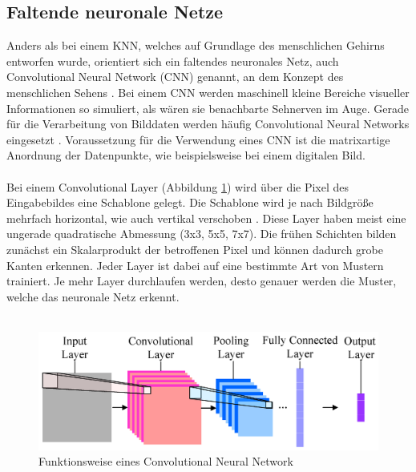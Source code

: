 \documentclass[a4paper,12pt,oneside]{article}
\begin{document}
\subsection{Faltende neuronale Netze}
Anders als bei einem KNN, welches auf Grundlage des menschlichen Gehirns entworfen wurde, orientiert sich ein faltendes neuronales Netz, auch \glqq Convolutional Neural Network\grqq{} (CNN) genannt, an dem Konzept des menschlichen Sehens \cite{lecun1989backpropagation}. Bei einem CNN werden maschinell kleine Bereiche visueller Informationen so simuliert, als wären sie benachbarte Sehnerven im Auge. Gerade für die Verarbeitung von Bilddaten werden häufig \glqq Convolutional Neural Networks\grqq{} eingesetzt \cite[326]{goodfellow2016deep}. Voraussetzung für die Verwendung eines CNN ist die matrixartige Anordnung der Datenpunkte, wie beispielsweise bei einem digitalen Bild.
\\
\\
Bei einem \glqq Convolutional Layer\grqq{} (Abbildung \ref{img:CNN}) wird über die Pixel des Eingabebildes eine Schablone gelegt. Die Schablone wird je nach Bildgröße mehrfach horizontal, wie auch vertikal verschoben \cite[327-335]{goodfellow2016deep}. Diese Layer haben meist eine ungerade quadratische Abmessung (3x3, 5x5, 7x7). Die frühen Schichten bilden zunächst ein Skalarprodukt der betroffenen Pixel und können dadurch grobe Kanten erkennen. Jeder Layer ist dabei auf eine bestimmte Art von Mustern trainiert. Je mehr Layer durchlaufen werden, desto genauer werden die Muster, welche das neuronale Netz erkennt.
\\
\\
\begin{figure}
    [h]
	\centering
		\includegraphics[scale=1.5]{Sources/cnn2.png}
		\caption{Funktionsweise eines Convolutional Neural Network      			\cite{info7040061}}
	\label{img:CNN}
\end{figure}
\\
\\
\end{document}
